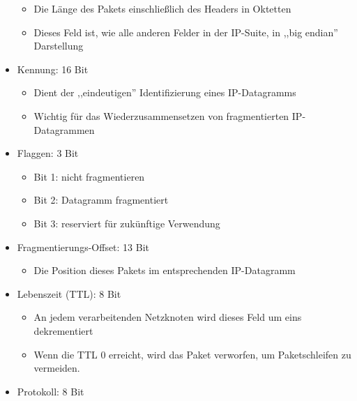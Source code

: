 \documentclass[a4paper]{article}
\begin{document}
\begin{multicols}{3}
\begin{itemize}
              \begin{itemize}
                  \item
                        Die Länge des Pakets einschließlich des Headers in Oktetten
                  \item
                        Dieses Feld ist, wie alle anderen Felder in der IP-Suite, in ,,big
                        endian'' Darstellung
              \end{itemize}
        \item
              Kennung: 16 Bit

              \begin{itemize}
                  \item
                        Dient der ,,eindeutigen'' Identifizierung eines IP-Datagramms
                  \item
                        Wichtig für das Wiederzusammensetzen von fragmentierten
                        IP-Datagrammen
              \end{itemize}
        \item
              Flaggen: 3 Bit

              \begin{itemize}
                  \item
                        Bit 1: nicht fragmentieren
                  \item
                        Bit 2: Datagramm fragmentiert
                  \item
                        Bit 3: reserviert für zukünftige Verwendung
              \end{itemize}
        \item
              Fragmentierungs-Offset: 13 Bit

              \begin{itemize}
                  \item
                        Die Position dieses Pakets im entsprechenden IP-Datagramm
              \end{itemize}
        \item
              Lebenszeit (TTL): 8 Bit

              \begin{itemize}
                  \item
                        An jedem verarbeitenden Netzknoten wird dieses Feld um eins
                        dekrementiert
                  \item
                        Wenn die TTL 0 erreicht, wird das Paket verworfen, um Paketschleifen
                        zu vermeiden.
              \end{itemize}
        \item
              Protokoll: 8 Bit


\end{itemize}
\end{multicols}
\end{document}
